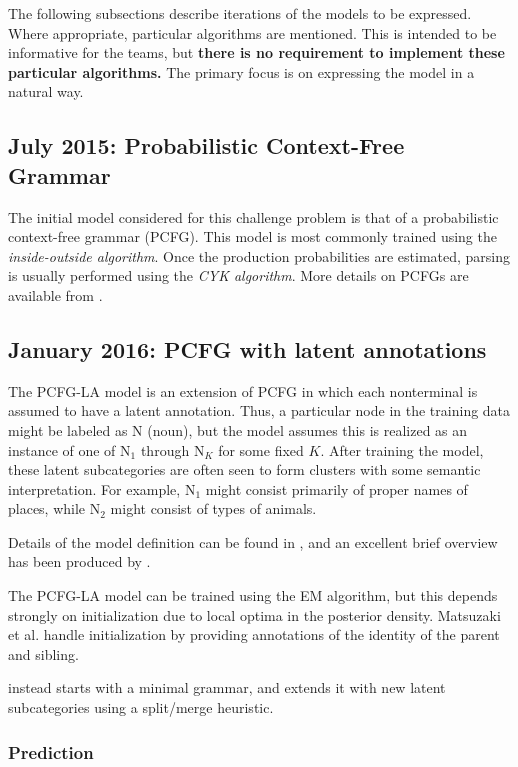 \documentclass[english]{article}
\begin{document}
The following subsections describe iterations of the models to be expressed. Where appropriate, particular algorithms are mentioned. This is intended to be informative for the teams, but \textbf{there is no requirement to implement these particular algorithms.} The primary focus is on expressing the model in a natural way.
 
\subsection{July 2015: Probabilistic Context-Free Grammar}

The initial model considered for this challenge problem is that of a probabilistic context-free grammar (PCFG). This model is most commonly trained using the \emph{inside-outside algorithm}. Once the production probabilities are estimated, parsing is usually performed using the \emph{CYK algorithm}. More details on PCFGs are available from \citet{Collins}.

\subsection{January 2016: PCFG with latent annotations}

The PCFG-LA model is an extension of PCFG in which each nonterminal is assumed to have a latent annotation. Thus, a particular node in the training data might be labeled as N (noun), but the model assumes this is realized as an instance of one of N$_{1}$ through N$_{K}$ for some fixed $K$. After training the model, these latent subcategories are often seen to form clusters with some semantic interpretation. For example, N$_{1}$ might consist primarily of proper names of places, while N$_{2}$ might consist of types of animals.

Details of the model definition can be found in \citet{Matsuzaki2005}, and an excellent brief overview has been produced by \citet{Manning2012}.

The PCFG-LA model can be trained using the EM algorithm, but this depends strongly on initialization due to local optima in the posterior density. Matsuzaki et al. handle initialization by providing annotations of the identity of the parent and sibling. 

\citet{Petrov2006} instead starts with a minimal grammar, and extends it with new latent subcategories using a split/merge heuristic. 

\subsubsection*{Prediction}
\end{document}
